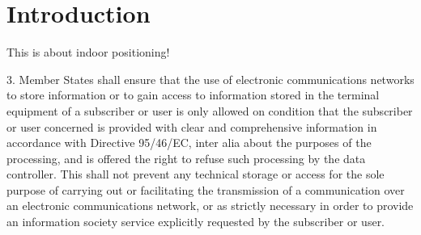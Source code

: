 \chapter{Introduction}
This is about indoor positioning!

3. Member States shall ensure that the use of electronic communications networks to store information or to gain access to information stored in the terminal equipment of a subscriber or user is only allowed on condition that the subscriber or user concerned is provided with clear and comprehensive information in accordance with Directive 95/46/EC, inter alia about the purposes of the processing, and is offered the right to refuse such processing by the data controller. This shall not prevent any technical storage or access for the sole purpose of carrying out or facilitating the transmission of a communication over an electronic communications network, or as strictly necessary in order to provide an information society service explicitly requested by the subscriber or user.
